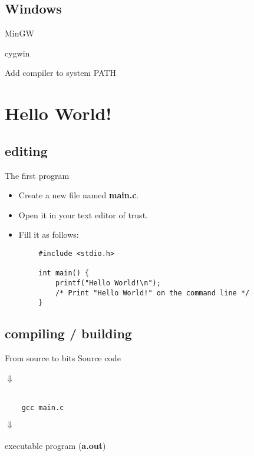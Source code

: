 \subsection{Windows}
\begin{frame}{MinGW}
	
\end{frame}
\begin{frame}{cygwin}
	
\end{frame}
\begin{frame}{Add compiler to system PATH}
	
\end{frame}

\section{Hello World!}
\subsection{editing}
\begin{frame}[fragile]{The first program}
	\begin{itemize}
		\item Create a new file named \textbf{main.c}.
		\item Open it in your text editor of trust.
		\item Fill it as follows:
	\end{itemize}
	\begin{lstlisting}
		#include <stdio.h>
		
		int main() {
		    printf("Hello World!\n");
		    /* Print "Hello World!" on the command line */
		}
	\end{lstlisting}
\end{frame}
\subsection{compiling / building}
\begin{frame}[fragile]{From source to bits}
	\centering
	Source code\\\ \\
	$\Downarrow$\\\ \\
	\begin{lstlisting}
	gcc main.c
	\end{lstlisting}
	$\Downarrow$\\\ \\
	executable program (\textbf{a.out})\\
\end{frame}
